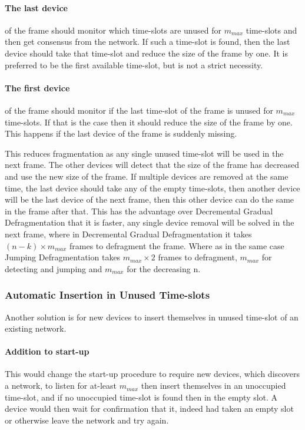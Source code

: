 \paragraph{The last device} of the frame should monitor which time-slots are unused for $m_{max}$ time-slots and then get consensus from the network. 
If such a time-slot is found, then the last device should take that time-slot and reduce the size of the frame by one. 
It is preferred to be the first available time-slot, but is not a strict necessity.   

\paragraph{The first device} of the frame should monitor if the last time-slot of the frame is unused for $m_{max}$ time-slots.
If that is the case then it should reduce the size of the frame by one.
This happens if the last device of the frame is suddenly missing.


\bigskip \noindent
This reduces fragmentation as any single unused time-slot will be used in the next frame.
The other devices will detect that the size of the frame has decreased and use the new size of the frame. 
If multiple devices are removed at the same time, the last device should take any of the empty time-slots, then another device will be the last device of the next frame, then this other device can do the same in the frame after that. 
This has the advantage over Decremental Gradual Defragmentation that it is faster, any single device removal will be solved in the next frame, where in Decremental Gradual Defragmentation it takes $(n - k) \times m_{max}$ frames to defragment the frame. 
Where as in the same case Jumping Defragmentation takes $m_{max} \times 2$ frames to defragment, $m_{max}$ for detecting and jumping and $m_{max}$ for the decreasing n. 

\subsubsection{Automatic Insertion in Unused Time-slots}
Another solution is for new devices to insert themselves in unused time-slot of an existing network.

\paragraph{Addition to start-up}
This would change the start-up procedure to require new devices, which discovers a network, to listen for at-least $m_{max}$ then insert themselves in an unoccupied time-slot, and if no unoccupied time-slot is found then in the empty slot.
A device would then wait for confirmation that it, indeed had taken an empty slot or otherwise leave the network and try again.

